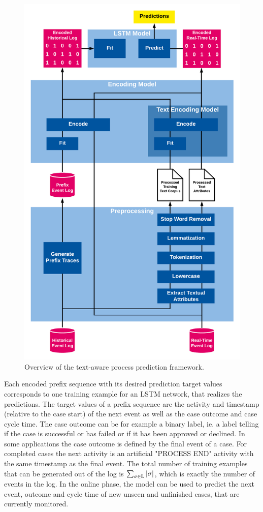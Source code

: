 \begin{figure}[!htbp]
	\includegraphics[width=\textwidth]{figures/framework}
	\caption[Overview of the text-aware process prediction framework]{Overview of the text-aware process prediction framework.}
	\label{fig:framework}
\end{figure}

Each encoded prefix sequence with its desired prediction target values corresponds to one training example for an LSTM network, that realizes the predictions. 
The target values of a prefix sequence are the activity and timestamp (relative to the case start) of the next event as well as the case outcome and case cycle time.
The case outcome can be for example a binary label, ie. a label telling if the case is successful or has failed or if it has been approved or declined.
In some applications the case outcome is defined by the final event of a case.
For completed cases the next activity is an artificial "PROCESS END" activity with the same timestamp as the final event.
The total number of training examples that can be generated out of the log is $\sum_{\sigma \in \mathbb{L}}|\sigma|$, which is exactly the number of events in the log.
In the online phase, the model can be used to predict the next event, outcome and cycle time of new unseen and unfinished cases, that are currently monitored.


